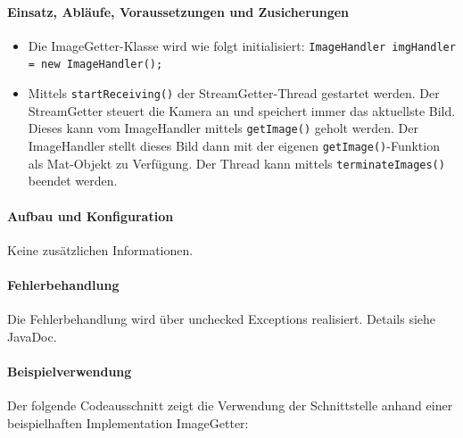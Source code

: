 \paragraph{Einsatz, Abläufe, Voraussetzungen und Zusicherungen}
\begin{itemize}
	\item{Die ImageGetter-Klasse wird wie folgt initialisiert: \verb?ImageHandler imgHandler = new ImageHandler();? }
	\item{Mittels \verb?startReceiving()? der StreamGetter-Thread gestartet werden. Der StreamGetter steuert die Kamera an und speichert immer das aktuellste Bild. Dieses kann vom ImageHandler mittels \verb?getImage()? geholt werden. Der ImageHandler stellt dieses Bild dann mit der eigenen \verb?getImage()?-Funktion als Mat-Objekt zu Verfügung. Der Thread kann mittels \verb?terminateImages()? beendet werden.}
\end{itemize}

\paragraph{Aufbau und Konfiguration} 
Keine zusätzlichen Informationen. \\

\paragraph{Fehlerbehandlung}
Die Fehlerbehandlung wird über unchecked Exceptions realisiert. Details siehe JavaDoc. \\

\paragraph{Beispielverwendung}
Der folgende Codeausschnitt zeigt die Verwendung der Schnittstelle anhand einer beispielhaften Implementation ImageGetter: \\

